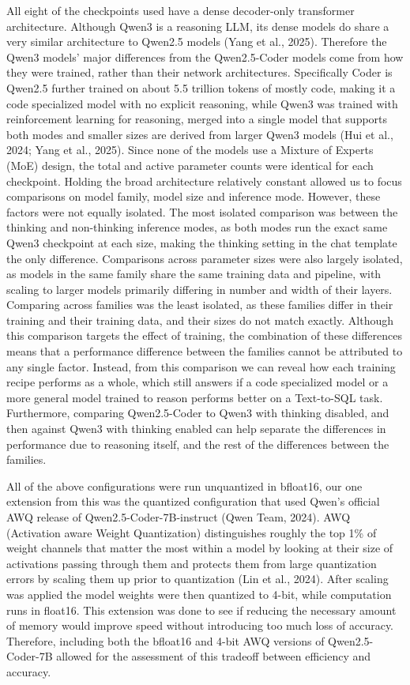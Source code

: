 All eight of the checkpoints used have a dense decoder-only transformer architecture. Although Qwen3 is a reasoning LLM, its dense models do share a very similar architecture to Qwen2.5 models (Yang et al., 2025). Therefore the Qwen3 models' major differences from the Qwen2.5-Coder models come from how they were trained, rather than their network architectures. Specifically Coder is Qwen2.5 further trained on about 5.5 trillion tokens of mostly code, making it a code specialized model with no explicit reasoning, while Qwen3 was trained with reinforcement learning for reasoning, merged into a single model that supports both modes and smaller sizes are derived from larger Qwen3 models (Hui et al., 2024; Yang et al., 2025). Since none of the models use a Mixture of Experts (MoE) design, the total and active parameter counts were identical for each checkpoint. Holding the broad architecture relatively constant allowed us to focus comparisons on model family, model size and inference mode. However, these factors were not equally isolated. The most isolated comparison was between the thinking and non-thinking inference modes, as both modes run the exact same Qwen3 checkpoint at each size, making the thinking setting in the chat template the only difference. Comparisons across parameter sizes were also largely isolated, as models in the same family share the same training data and pipeline, with scaling to larger models primarily differing in number and width of their layers. Comparing across families was the least isolated, as these families differ in their training and their training data, and their sizes do not match exactly. Although this comparison targets the effect of training, the combination of these differences means that a performance difference between the families cannot be attributed to any single factor. Instead, from this comparison we can reveal how each training recipe performs as a whole, which still answers if a code specialized model or a more general model trained to reason performs better on a Text-to-SQL task. Furthermore, comparing Qwen2.5-Coder to Qwen3 with thinking disabled, and then against Qwen3 with thinking enabled can help separate the differences in performance due to reasoning itself, and the rest of the differences between the families.

All of the above configurations were run unquantized in bfloat16, our one extension from this was the quantized configuration that used Qwen's official AWQ release of Qwen2.5-Coder-7B-instruct (Qwen Team, 2024). AWQ (Activation aware Weight Quantization) distinguishes roughly the top 1\% of weight channels that matter the most within a model by looking at their size of activations passing through them and protects them from large quantization errors by scaling them up prior to quantization (Lin et al., 2024). After scaling was applied the model weights were then quantized to 4-bit, while computation runs in float16. This extension was done to see if reducing the necessary amount of memory would improve speed without introducing too much loss of accuracy. Therefore, including both the bfloat16 and 4-bit AWQ versions of Qwen2.5-Coder-7B allowed for the assessment of this tradeoff between efficiency and accuracy.

